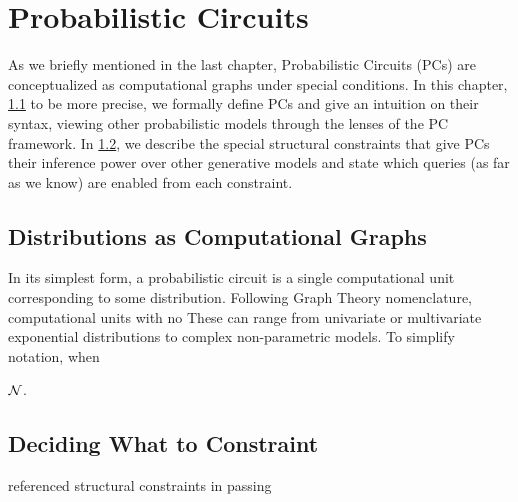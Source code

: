 \chapter{Probabilistic Circuits}
\label{ch:pc}

As we briefly mentioned in the last chapter, Probabilistic Circuits (PCs) are conceptualized as
computational graphs under special conditions. In this chapter, \cref{sec:pc} to be more precise,
we formally define PCs and give an intuition on their syntax, viewing other probabilistic models
through the lenses of the PC framework. In \cref{sec:const}, we describe the special structural
constraints that give PCs their inference power over other generative models and state which
queries (as far as we know) are enabled from each constraint.

\section{Distributions as Computational Graphs}
\label{sec:pc}

In its simplest form, a probabilistic circuit is a single computational unit corresponding to some
distribution. Following Graph Theory nomenclature, computational units with no  These can range from univariate or multivariate exponential distributions to complex
non-parametric models. To simplify notation, when 

$\operatorname{\mathcal{N}}$.

\section{Deciding What to Constraint}
\label{sec:const}


referenced structural constraints in passing

